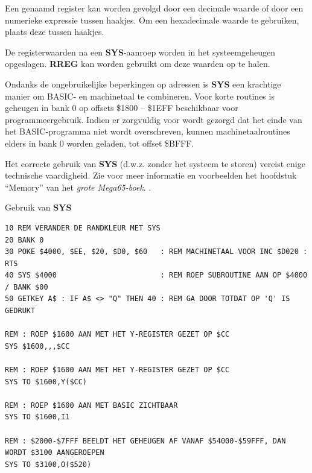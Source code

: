 \begin{description}[leftmargin=2cm,style=nextline]
                  Een genaamd register kan worden gevolgd door een decimale waarde of door een numerieke expressie tussen haakjes. Om een hexadecimale waarde te gebruiken, plaats deze tussen haakjes.

\item [Opmerkingen:]  De registerwaarden na een {\bf SYS}-aanroep worden in het systeemgeheugen opgeslagen. {\bf RREG} kan worden gebruikt om deze waarden op te halen.

                  Ondanks de ongebruikelijke beperkingen op adressen is {\bf SYS} een krachtige manier om BASIC- en machinetaal te combineren. Voor korte routines is geheugen in bank 0 op offsets \$1800 -- \$1EFF beschikbaar voor programmeergebruik. Indien er zorgvuldig voor wordt gezorgd dat het einde van het BASIC-programma niet wordt overschreven, kunnen machinetaalroutines elders in bank 0 worden geladen, tot offset \$BFFF.

                  Het correcte gebruik van {\bf SYS} (d.w.z. zonder het systeem te storen) vereist enige technische vaardigheid. Zie voor meer informatie en voorbeelden \ifdefined\printmanual
het hoofdstuk ``Memory'' van het {\em grote Mega65-boek}.
                  \else
                     .
                  \fi

\item [Voorbeeld:]  Gebruik van {\bf SYS}

\begin{tcolorbox}[colback=black,coltext=white]
\verbatimfont{\codefont}
\begin{verbatim}
10 REM VERANDER DE RANDKLEUR MET SYS
20 BANK 0
30 POKE $4000, $EE, $20, $D0, $60   : REM MACHINETAAL VOOR INC $D020 : RTS
40 SYS $4000                        : REM ROEP SUBROUTINE AAN OP $4000 / BANK $00
50 GETKEY A$ : IF A$ <> "Q" THEN 40 : REM GA DOOR TOTDAT OP 'Q' IS GEDRUKT

REM : ROEP $1600 AAN MET HET Y-REGISTER GEZET OP $CC
SYS $1600,,,$CC

REM : ROEP $1600 AAN MET HET Y-REGISTER GEZET OP $CC
SYS TO $1600,Y($CC)

REM : ROEP $1600 AAN MET BASIC ZICHTBAAR
SYS TO $1600,I1

REM : $2000-$7FFF BEELDT HET GEHEUGEN AF VANAF $54000-$59FFF, DAN WORDT $3100 AANGEROEPEN
SYS TO $3100,O($520)
\end{verbatim}
\end{tcolorbox}
\end{description}

